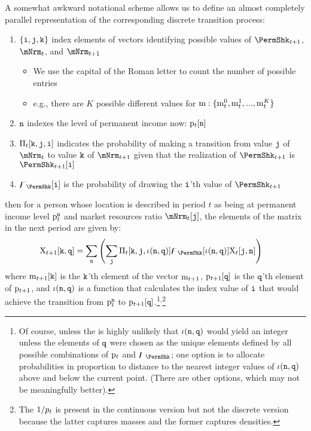\documentclass[\econtexRoot/BufferStockTheory]{subfiles}
\begin{document}
\noindent A somewhat awkward notational scheme allows us to define an almost completely parallel representation of the corresponding discrete transition process:
\begin{enumerate}
\item $\{\texttt{i}, \texttt{j}, \texttt{k}\}$ index elements of vectors identifying possible values of $\PermShkPrbNxt$, $\mNrmNow$, and $\mNrmNxt$
  \begin{itemize}
  \item We use the capital of the Roman letter to count the number of possible entries
    \item e.g., there are $K$ possible different values for $\mathrm{m}:\{\mathrm{m}_{t}^{0},\mathrm{m}_{t}^{1},...,\mathrm{m}_{t}^{K}\}$
    \end{itemize}
\item $\texttt{n}$ indexes the level of permanent income now: $\mathrm{p}_{t}[\texttt{n}]$
\item$\Pi_{t}[\texttt{k},\texttt{j},\texttt{i}]$ indicates the probability of making a transition from value $\texttt{j}$ of $\mNrmNow$ to value $\texttt{k}$ of $\mNrmNxt$ given that the realization of $\PermShkPrbNxt$ is $\PermShkPrbNxt[\nPermShk]$
\item $\PermShkVec[\nPermShk]$ is the probability of drawing the $\texttt{i}$'th value of $\PermShkPrbNxt$
\end{enumerate}
then for a person whose location is described in period $t$ as being at permanent income level $\mathrm{p}_{t}^{\texttt{n}}$ and market resources ratio $\mNrmNow[\nmNrmVecNow]$, the elements of the matrix in the next period are given by:
\begin{equation}\begin{aligned} \label{eq:mpMattp1}
  \mpMat_{t+1}[\nmNrmVecNxt,\nPermLvlVecNxt] & = \sum_{\nPermLvlVecNow} \left(\sum_{\nmNrmVecNow} \lomdkMat_{t}[\nmNrmVecNxt,\nmNrmVecNow,\nPermShkNxtFunc]\PermShkVec[\nPermShkNxtFunc]\mpMat_{t}[\nmNrmVecNow,\nPermLvlVecNow]  \right)
\end{aligned}\end{equation}
where $\mathrm{m}_{t+1}[\texttt{k}]$ is the $\texttt{k}$'th element of the vector $\mathrm{m}_{t+1}$, $\mathrm{p}_{t+1}[\texttt{q}]$ is the $\texttt{q}$'th element of $\mathrm{p}_{t+1}$, and $\iota(\texttt{n},\texttt{q})$ is a function that calculates the index value of $\texttt{i}$ that would achieve the transition from $\mathrm{p}_{t}^{\texttt{n}}$ to $\mathrm{p}_{t+1}[\texttt{q}]$.\footnote{Of course, unless the is highly unlikely that $\iota(\texttt{n},\texttt{q})$ would yield an integer unless the elements of $\texttt{q}$ were chosen as the unique elements defined by all possible combinations of $\mathrm{p}_{t}$ and $\PermShkVec$; one option is to allocate probabilities in proportion to distance to the nearest integer values of $\iota(\texttt{n},\texttt{q})$ above and below the current point.  (There are other options, which may not be meaningfully better).}$^{,}$\footnote{The $1/p_{t}$ is present in the continuous version but not the discrete version because the latter captures masses and the former captures densities.}
\end{document}
